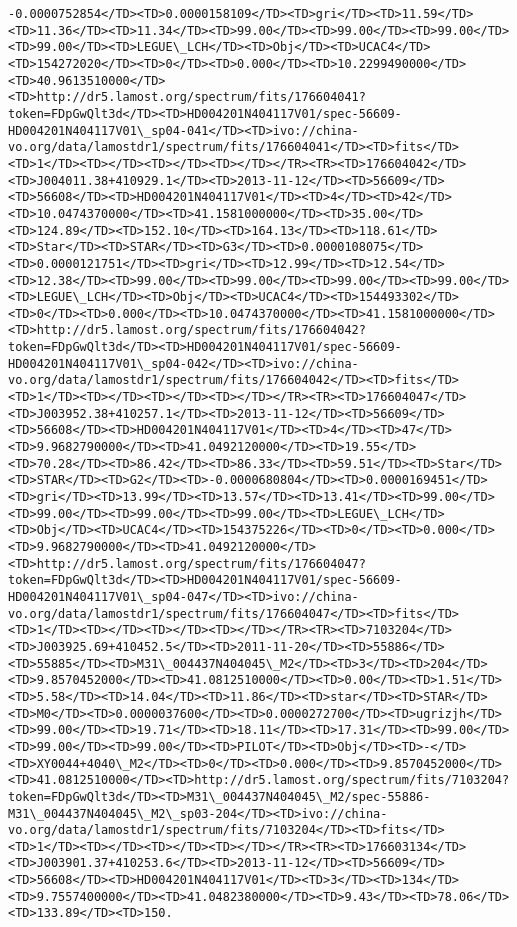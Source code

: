 \documentclass[11pt]{article}
\begin{document}
\begin{Verbatim}[commandchars=\\\{\}]
-0.0000752854</TD><TD>0.0000158109</TD><TD>gri</TD><TD>11.59</TD><TD>11.36</TD><TD>11.34</TD><TD>99.00</TD><TD>99.00</TD><TD>99.00</TD><TD>99.00</TD><TD>LEGUE\_LCH</TD><TD>Obj</TD><TD>UCAC4</TD><TD>154272020</TD><TD>0</TD><TD>0.000</TD><TD>10.2299490000</TD><TD>40.9613510000</TD><TD>http://dr5.lamost.org/spectrum/fits/176604041?token=FDpGwQlt3d</TD><TD>HD004201N404117V01/spec-56609-HD004201N404117V01\_sp04-041</TD><TD>ivo://china-vo.org/data/lamostdr1/spectrum/fits/176604041</TD><TD>fits</TD><TD>1</TD><TD></TD><TD></TD><TD></TD></TR><TR><TD>176604042</TD><TD>J004011.38+410929.1</TD><TD>2013-11-12</TD><TD>56609</TD><TD>56608</TD><TD>HD004201N404117V01</TD><TD>4</TD><TD>42</TD><TD>10.0474370000</TD><TD>41.1581000000</TD><TD>35.00</TD><TD>124.89</TD><TD>152.10</TD><TD>164.13</TD><TD>118.61</TD><TD>Star</TD><TD>STAR</TD><TD>G3</TD><TD>0.0000108075</TD><TD>0.0000121751</TD><TD>gri</TD><TD>12.99</TD><TD>12.54</TD><TD>12.38</TD><TD>99.00</TD><TD>99.00</TD><TD>99.00</TD><TD>99.00</TD><TD>LEGUE\_LCH</TD><TD>Obj</TD><TD>UCAC4</TD><TD>154493302</TD><TD>0</TD><TD>0.000</TD><TD>10.0474370000</TD><TD>41.1581000000</TD><TD>http://dr5.lamost.org/spectrum/fits/176604042?token=FDpGwQlt3d</TD><TD>HD004201N404117V01/spec-56609-HD004201N404117V01\_sp04-042</TD><TD>ivo://china-vo.org/data/lamostdr1/spectrum/fits/176604042</TD><TD>fits</TD><TD>1</TD><TD></TD><TD></TD><TD></TD></TR><TR><TD>176604047</TD><TD>J003952.38+410257.1</TD><TD>2013-11-12</TD><TD>56609</TD><TD>56608</TD><TD>HD004201N404117V01</TD><TD>4</TD><TD>47</TD><TD>9.9682790000</TD><TD>41.0492120000</TD><TD>19.55</TD><TD>70.28</TD><TD>86.42</TD><TD>86.33</TD><TD>59.51</TD><TD>Star</TD><TD>STAR</TD><TD>G2</TD><TD>-0.0000680804</TD><TD>0.0000169451</TD><TD>gri</TD><TD>13.99</TD><TD>13.57</TD><TD>13.41</TD><TD>99.00</TD><TD>99.00</TD><TD>99.00</TD><TD>99.00</TD><TD>LEGUE\_LCH</TD><TD>Obj</TD><TD>UCAC4</TD><TD>154375226</TD><TD>0</TD><TD>0.000</TD><TD>9.9682790000</TD><TD>41.0492120000</TD><TD>http://dr5.lamost.org/spectrum/fits/176604047?token=FDpGwQlt3d</TD><TD>HD004201N404117V01/spec-56609-HD004201N404117V01\_sp04-047</TD><TD>ivo://china-vo.org/data/lamostdr1/spectrum/fits/176604047</TD><TD>fits</TD><TD>1</TD><TD></TD><TD></TD><TD></TD></TR><TR><TD>7103204</TD><TD>J003925.69+410452.5</TD><TD>2011-11-20</TD><TD>55886</TD><TD>55885</TD><TD>M31\_004437N404045\_M2</TD><TD>3</TD><TD>204</TD><TD>9.8570452000</TD><TD>41.0812510000</TD><TD>0.00</TD><TD>1.51</TD><TD>5.58</TD><TD>14.04</TD><TD>11.86</TD><TD>star</TD><TD>STAR</TD><TD>M0</TD><TD>0.0000037600</TD><TD>0.0000272700</TD><TD>ugrizjh</TD><TD>99.00</TD><TD>19.71</TD><TD>18.11</TD><TD>17.31</TD><TD>99.00</TD><TD>99.00</TD><TD>99.00</TD><TD>PILOT</TD><TD>Obj</TD><TD>-</TD><TD>XY0044+4040\_M2</TD><TD>0</TD><TD>0.000</TD><TD>9.8570452000</TD><TD>41.0812510000</TD><TD>http://dr5.lamost.org/spectrum/fits/7103204?token=FDpGwQlt3d</TD><TD>M31\_004437N404045\_M2/spec-55886-M31\_004437N404045\_M2\_sp03-204</TD><TD>ivo://china-vo.org/data/lamostdr1/spectrum/fits/7103204</TD><TD>fits</TD><TD>1</TD><TD></TD><TD></TD><TD></TD></TR><TR><TD>176603134</TD><TD>J003901.37+410253.6</TD><TD>2013-11-12</TD><TD>56609</TD><TD>56608</TD><TD>HD004201N404117V01</TD><TD>3</TD><TD>134</TD><TD>9.7557400000</TD><TD>41.0482380000</TD><TD>9.43</TD><TD>78.06</TD><TD>133.89</TD><TD>150.
\end{Verbatim}
\end{document}
